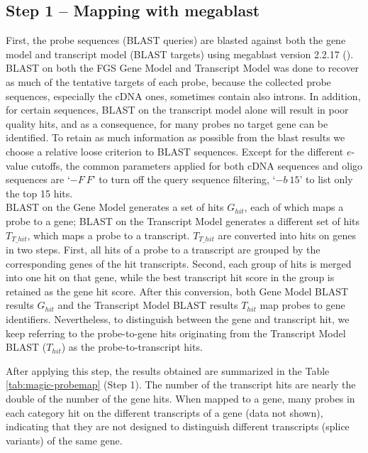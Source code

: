 \subsection{Step 1 – Mapping with megablast}

First, the probe sequences (BLAST queries) are blasted against both the gene 
model and transcript model (BLAST targets) using megablast version 2.2.17  
(\cite{zhang2000}). 
BLAST on both the FGS Gene Model and Transcript Model was done to recover as 
much of the tentative targets of each probe, because the collected probe 
sequences, especially the cDNA ones, sometimes contain also 
introns.  
In addition, for certain  sequences, BLAST on the transcript model 
alone will result in poor quality hits, and as a consequence, for many probes 
no target gene can be identified. 
To retain as much information as possible from the blast results we choose a 
relative loose criterion to BLAST sequences. 
Except for the different $e$-value cutoffs, the common parameters applied for 
both cDNA sequences and oligo sequences are ‘$-F\:F$’ to turn off the query 
sequence filtering, ‘$-b\:15$’ to list only the top 15 hits. \\
BLAST on the Gene Model generates a set of hits $G_{hit}$, each of which maps a 
probe to a gene; BLAST on the Transcript Model generates a different set of 
hits $T_{T\_hit}$, which maps a probe to a transcript. 
$T_{T\_hit}$ are converted into hits on genes in two steps. 
First, all hits of a probe to a transcript are grouped by the 
corresponding genes of the hit transcripts. 
Second, each group of hits is merged into one hit on that gene, while the best 
transcript hit score in the group is retained as the gene hit score. 
After this conversion, both Gene Model BLAST results $G_{hit}$  and the 
Transcript Model BLAST results $T_{hit}$ map probes to gene identifiers. 
Nevertheless, to distinguish between the gene and transcript hit, we keep 
referring to the probe-to-gene hits originating from the Transcript 
Model BLAST ($T_{hit}$) as the probe-to-transcript hits.  

After applying this step, the results obtained are summarized in the Table 
\ref{tab:magic-probemap} (Step 1). 
The number of the transcript hits are nearly the double of the number of the 
gene hits.
When mapped to a gene, many probes in each category hit on the different 
transcripts of a gene (data not shown),
indicating that they are not designed to distinguish different 
transcripts (splice variants) of the same gene.

